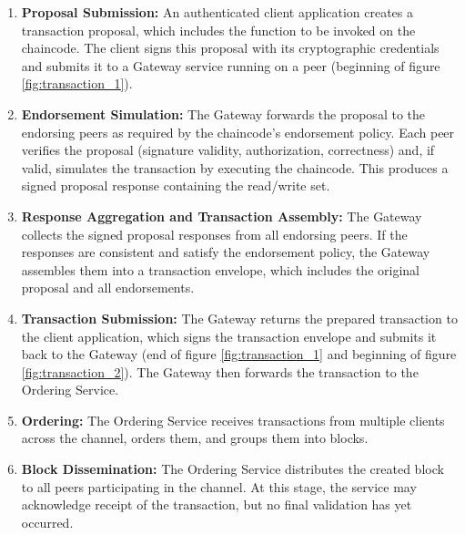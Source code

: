 \documentclass{scrbook}
\begin{document}
\begin{enumerate}
    \item \textbf{Proposal Submission:} An authenticated client application creates a transaction proposal, which includes the function to be invoked on the chaincode. The client signs this proposal with its cryptographic credentials and submits it to a Gateway service running on a peer (beginning of figure \ref{fig:transaction_1}).
    
    \item \textbf{Endorsement Simulation:} The Gateway forwards the proposal to the endorsing peers as required by the chaincode's endorsement policy. Each peer verifies the proposal (signature validity, authorization, correctness) and, if valid, simulates the transaction by executing the chaincode. This produces a signed proposal response containing the read/write set.
    
    \item \textbf{Response Aggregation and Transaction Assembly:} The Gateway collects the signed proposal responses from all endorsing peers. If the responses are consistent and satisfy the endorsement policy, the Gateway assembles them into a transaction envelope, which includes the original proposal and all endorsements.
    
    \item \textbf{Transaction Submission:} The Gateway returns the prepared transaction to the client application, which signs the transaction envelope and submits it back to the Gateway (end of figure \ref{fig:transaction_1} and beginning of figure \ref{fig:transaction_2}). The Gateway then forwards the transaction to the Ordering Service.
    
    \item \textbf{Ordering:} The Ordering Service receives transactions from multiple clients across the channel, orders them, and groups them into blocks.
    
    \item \textbf{Block Dissemination:} The Ordering Service distributes the created block to all peers participating in the channel. At this stage, the service may acknowledge receipt of the transaction, but no final validation has yet occurred.
    

\end{enumerate}
\end{document}
